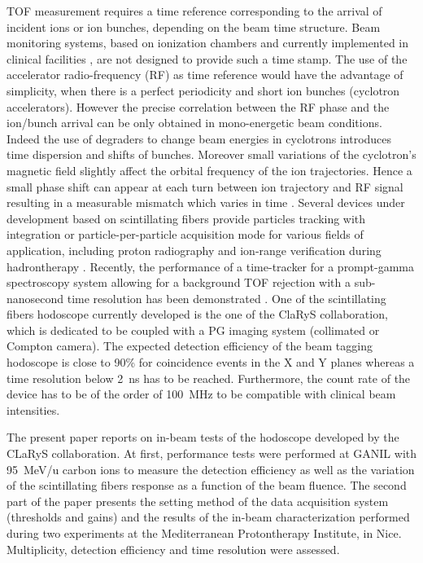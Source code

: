 \documentclass[a4paper,11pt]{article}
\begin{document}
TOF measurement requires a time reference corresponding to the arrival of incident ions or ion bunches, depending on the beam time structure. Beam monitoring systems, based on ionization chambers and currently implemented in clinical facilities \cite{Stelzer2002}, are not designed to provide such a time stamp. The use of the accelerator radio-frequency (RF) as time reference would have the advantage of simplicity, when there is a perfect periodicity and short ion bunches (cyclotron accelerators). However the precise correlation between the RF phase and the ion/bunch arrival can be only obtained in mono-energetic beam conditions. 
Indeed the use of degraders to change beam energies in cyclotrons introduces time dispersion and shifts of bunches. Moreover small variations of the cyclotron’s magnetic field slightly affect the orbital frequency of the ion trajectories. Hence a small phase shift can appear at each turn between ion trajectory and RF signal resulting in a measurable mismatch which varies in time \cite{Werner2019}. 
Several devices under development based on scintillating fibers provide particles tracking with integration \cite{Leverington2018} or particle-per-particle \cite{Horikawa2004, Achenbach2008, Braccini2012} acquisition mode for various fields of application, including proton radiography \cite{Presti2013} and ion-range verification during hadrontherapy \cite{PAPA2016}. Recently, the performance of a time-tracker for a prompt-gamma spectroscopy system allowing for a background TOF rejection with a sub-nanosecond time resolution has been demonstrated \cite{Martins2020}. One of the scintillating fibers hodoscope currently developed is the one of the ClaRyS collaboration, which is dedicated to be coupled with a PG imaging system (collimated or Compton camera). The expected detection efficiency of the beam tagging hodoscope is close to 90\% for coincidence events in the X and Y planes whereas a time resolution below 2~ns has to be reached. Furthermore, the count rate of the device has to be of the order of 100~MHz to be compatible with clinical beam intensities.

The present paper reports on in-beam tests of the hodoscope developed by the CLaRyS collaboration. At first, performance tests were performed at GANIL with 95~MeV/u carbon ions to measure the detection efficiency as well as the variation of the scintillating fibers response as a function of the beam fluence. The second part of the paper presents the setting method of the data acquisition system (thresholds and gains) and the results of the in-beam characterization performed during two experiments at the Mediterranean Protontherapy Institute, in Nice. Multiplicity, detection efficiency and time resolution were assessed. 
\end{document}
